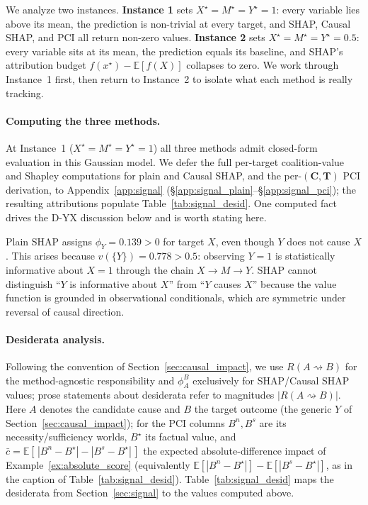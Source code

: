 We analyze two instances. \textbf{Instance 1} sets $X^\star=M^\star=Y^\star=1$: every
variable lies above its mean, the prediction is non-trivial at every target, and SHAP,
Causal SHAP, and PCI all return non-zero values. \textbf{Instance 2} sets
$X^\star=M^\star=Y^\star=0.5$: every variable sits at its mean, the prediction equals
its baseline, and SHAP's attribution budget $f(x^\star)-\mathbb{E}[f(X)]$ collapses
to zero. We work through Instance~1 first, then return to Instance~2 to isolate what
each method is really tracking.

\paragraph{Computing the three methods.}
At Instance~1 ($X^\star=M^\star=Y^\star=1$) all three methods admit closed-form
evaluation in this Gaussian model. We defer the full per-target coalition-value
and Shapley computations for plain and Causal SHAP, and the
per-$(\mathbf{C},\mathbf{T})$ PCI derivation, to Appendix~\ref{app:signal}
(\S\ref{app:signal_plain}--\S\ref{app:signal_pci}); the resulting attributions
populate Table~\ref{tab:signal_desid}. One computed fact drives the D-YX
discussion below and is worth stating here.


\noindent Plain SHAP assigns $\phi_Y = 0.139 > 0$ for target $X$, even though $Y$ does not
cause $X$. This arises because $v(\{Y\}) = 0.778 > 0.5$: observing $Y{=}1$ is
statistically informative about $X{=}1$ through the chain $X \to M \to Y$. SHAP
cannot distinguish ``$Y$ is informative about $X$'' from ``$Y$ causes $X$''
because the value function is grounded in observational conditionals, which are
symmetric under reversal of causal direction.



\paragraph{Desiderata analysis.}\label{sec:signal_desiderata}
Following the convention of Section~\ref{sec:causal_impact}, we use $R(A \rightsquigarrow B)$
for the method-agnostic responsibility and $\phi_A^B$ exclusively for SHAP/Causal SHAP values;
prose statements about desiderata refer to magnitudes $|R(A \rightsquigarrow B)|$.
Here $A$ denotes the candidate cause and $B$ the target outcome (the generic $Y$ of
Section~\ref{sec:causal_impact}); for the PCI columns $B^n, B^s$ are its
necessity/sufficiency worlds, $B^\star$ its factual value, and
$\bar c = \mathbb{E}\!\left[\,|B^n - B^\star| - |B^s - B^\star|\,\right]$ the expected
absolute-difference impact of Example~\ref{ex:absolute_score} (equivalently
$\mathbb{E}[|B^n-B^\star|] - \mathbb{E}[|B^s-B^\star|]$, as in the caption of
Table~\ref{tab:signal_desid}).
Table~\ref{tab:signal_desid} maps the desiderata from Section~\ref{sec:signal}
to the values computed above.

